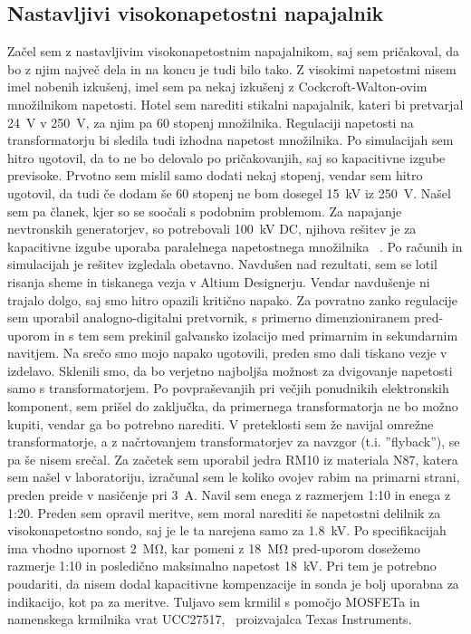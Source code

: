 \documentclass[a4paper,twoside,openright,12pt,Slovene]{book}
\begin{document}
	\subsection{Nastavljivi visokonapetostni napajalnik}
	Začel sem z nastavljivim visokonapetostnim napajalnikom, saj sem pričakoval, da bo z njim največ dela in na koncu je tudi bilo tako. Z visokimi napetostmi nisem imel nobenih izkušenj, imel sem pa nekaj izkušenj z Cockcroft-Walton-ovim množilnikom napetosti. Hotel sem narediti stikalni napajalnik, kateri bi pretvarjal \SI{24}{\volt} v \SI{250}{\volt}, za njim pa 60 stopenj množilnika. Regulaciji napetosti na transformatorju bi sledila tudi izhodna napetost množilnika. Po simulacijah sem hitro ugotovil, da to ne bo delovalo po pričakovanjih, saj so kapacitivne izgube previsoke. Prvotno sem mislil samo dodati nekaj stopenj, vendar sem hitro ugotovil, da tudi če dodam še 60 stopenj ne bom dosegel \SI{15}{\kilo\volt} iz \SI{250}{\volt}. Našel sem pa članek, kjer so se soočali s podobnim problemom. Za napajanje nevtronskih generatorjev, so potrebovali \SI{100}{\kilo\volt} DC, njihova rešitev je za kapacitivne izgube uporaba paralelnega napetostnega množilnika  ~\cite{ParallelHighVoltageMultipliers}. Po računih in simulacijah je rešitev izgledala obetavno. Navdušen nad rezultati, sem se lotil risanja sheme in tiskanega vezja v Altium Designerju. Vendar navdušenje ni trajalo dolgo, saj smo hitro opazili kritično napako. Za povratno zanko regulacije sem uporabil analogno-digitalni pretvornik, s primerno dimenzioniranem pred-uporom in s tem sem prekinil galvansko izolacijo med primarnim in sekundarnim navitjem. Na srečo smo mojo napako ugotovili, preden smo dali tiskano vezje v izdelavo. Sklenili smo, da bo verjetno najboljša možnost za dvigovanje napetosti samo s transformatorjem. Po povpraševanjih pri večjih ponudnikih elektronskih komponent, sem prišel do zaključka, da primernega transformatorja ne bo možno kupiti, vendar ga bo potrebno narediti. V preteklosti sem že navijal omrežne transformatorje, a z načrtovanjem transformatorjev za navzgor (t.i. ''flyback''), se pa še nisem srečal. Za začetek sem uporabil jedra RM10 iz materiala N87, katera sem našel v laboratoriju, izračunal sem le koliko ovojev rabim na primarni strani, preden preide v nasičenje pri \SI{3}{\ampere}. Navil sem enega z razmerjem 1:10 in enega z 1:20.
Preden sem opravil meritve, sem moral narediti še napetostni delilnik za visokonapetostno sondo, saj je le ta narejena samo za \SI{1.8}{\kilo\volt}. Po specifikacijah ima vhodno upornost \SI{2}{\mega\ohm}, kar pomeni z \SI{18}{\mega\ohm} pred-uporom dosežemo razmerje 1:10 in posledično maksimalno napetost \SI{18}{\kilo\volt}. Pri tem je potrebno poudariti, da nisem dodal kapacitivne kompenzacije in sonda je bolj uporabna za indikacijo, kot pa za meritve. Tuljavo sem krmilil s pomočjo MOSFETa in namenskega krmilnika vrat UCC27517,~\cite{TI:UCC27517} proizvajalca Texas Instruments. 
\end{document}
